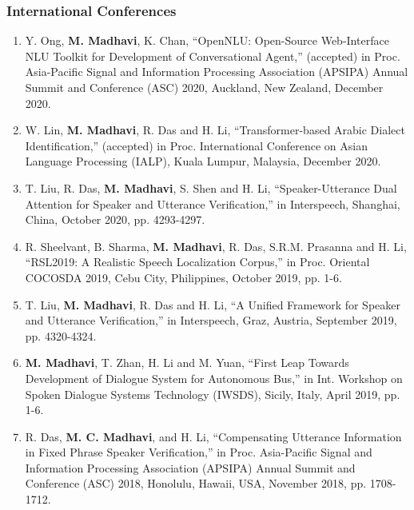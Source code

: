 \documentclass[10pt]{article}
\begin{document}
\subsubsection*{International Conferences}
\begin{enumerate}[resume]
				\setlength\itemsep{-0.05em}

\item Y. Ong, \textbf{M. Madhavi}, K. Chan, ``OpenNLU: Open-Source Web-Interface NLU Toolkit for Development of Conversational Agent,'' (accepted) in Proc. Asia-Pacific Signal and Information Processing Association (APSIPA) Annual Summit and Conference (ASC) 2020, Auckland, New Zealand, December 2020.



\item W. Lin, \textbf{M. Madhavi}, R. Das and H. Li, ``Transformer-based Arabic Dialect Identification,'' (accepted) in Proc. International Conference on Asian Language Processing (IALP), Kuala Lumpur, Malaysia, December 2020.


\item T. Liu, R. Das, \textbf{M. Madhavi}, S. Shen and H. Li, ``Speaker-Utterance Dual Attention for Speaker and Utterance Verification,''  in Interspeech, Shanghai, China, October 2020, pp. 4293-4297.

\item R. Sheelvant, B. Sharma, \textbf{M. Madhavi}, R. Das, S.R.M. Prasanna and H. Li, ``RSL2019: A Realistic Speech Localization Corpus,'' in Proc. Oriental COCOSDA 2019, Cebu City, Philippines, October 2019, pp. 1-6.

\item T. Liu, \textbf{M. Madhavi}, R. Das and H. Li, ``A Unified Framework for Speaker and Utterance Verification,'' in Interspeech, Graz, Austria, September 2019, pp. 4320-4324.

				
\item \textbf{M. Madhavi}, T. Zhan, H. Li and M. Yuan, ``First Leap Towards Development of Dialogue System for Autonomous Bus,'' in Int. Workshop on Spoken Dialogue Systems Technology (IWSDS),  Sicily, Italy, April 2019, pp. 1-6.

\item R. Das, \textbf{M. C. Madhavi}, and H. Li, ``Compensating Utterance Information in Fixed Phrase Speaker Verification,'' in Proc. Asia-Pacific Signal and Information Processing Association (APSIPA) Annual Summit and Conference (ASC) 2018, Honolulu, Hawaii, USA, November 2018, pp. 1708-1712.
				

\end{enumerate}
\end{document}
